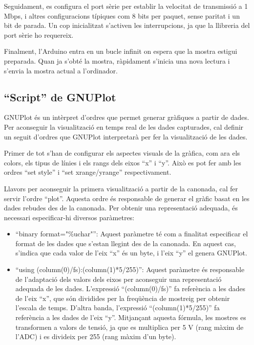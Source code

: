 \documentclass{tfgitic}[2023/06/30]
\begin{document}
Seguidament, es configura el port sèrie per establir la velocitat de
transmissió a 1 Mbps, i altres configuracions típiques com 8 bits per
paquet, sense paritat i un bit de parada. Un cop inicialitzat
s'activen les interrupcions, ja que la llibreria del port sèrie ho
requereix.

Finalment, l'Arduino entra en un bucle infinit on espera que la mostra
estigui preparada. Quan ja s'obté la mostra, ràpidament s'inicia una
nova lectura i s'envia la mostra actual a l'ordinador.

\subsection{``Script'' de GNUPlot}

GNUPlot és un intèrpret d'ordres que permet generar gràfiques a partir
de dades. Per aconseguir la visualització en temps real de les dades
capturades, cal definir un seguit d'ordres que GNUPlot interpretarà
per fer la visualització de les dades.

Primer de tot s'han de configurar els aspectes visuals de la gràfica,
com ara els colors, els tipus de línies i els rangs dels eixos ``x'' i
``y''. Això es pot fer amb les ordres ``set style'' i ``set
xrange/yrange'' respectivament.

Llavors per aconseguir la primera visualització a partir de la
canonada, cal fer servir l'ordre ``plot''. Aquesta ordre és
responsable de generar el gràfic basat en les dades rebudes des de la
canonada. Per obtenir una representació adequada, és necessari
especificar-hi diversos paràmetres:

\begin{itemize}
	\item ``binary format="\%uchar"'': Aquest paràmetre té com a
          finalitat especificar el format de les dades que s'estan
          llegint des de la canonada. En aquest cas, s'indica que cada
          valor de l'eix ``x'' és un byte, i l'eix ``y'' el genera
          GNUPlot.
	\item ``using (column(0)/fs):(column(1)*5/255)'': Aquest
          paràmetre és responsable de l'adaptació dels valors dels
          eixos per aconseguir una representació adequada de les
          dades. L'expressió ``(column(0)/fs)'' fa referència a les
          dades de l'eix ``x'', que són dividides per la freqüència de
          mostreig per obtenir l'escala de temps. D'altra banda,
          l'expressió ``(column(1)*5/255)'' fa referència a les dades
          de l'eix ``y''. Mitjançant aquesta fórmula, les mostres es
          transformen a valors de tensió, ja que es multiplica per 5 V
          (rang màxim de l'ADC) i es divideix per 255 (rang màxim d'un
          byte).
\end{itemize}
\end{document}
